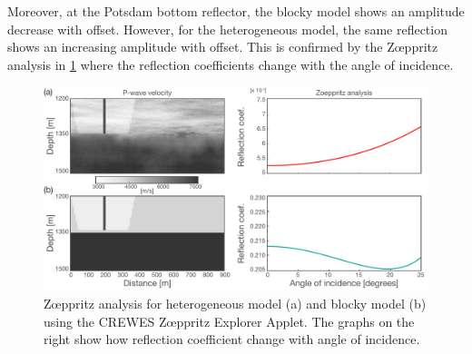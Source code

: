 Moreover, at the Potsdam bottom reflector, the blocky model shows an amplitude
decrease with offset. However, for the heterogeneous model, the same reflection
shows an increasing amplitude with offset. This is confirmed by the Zœppritz
analysis \citep{Aki1980} in \cref{fig:zoeppritz} where the reflection
coefficients change with the angle of incidence.
\begin{figure}[!ht]
\centering
\includegraphics[width=1\textwidth]{fig/zoeppritz.pdf}
\caption{Zœppritz analysis for heterogeneous model (a) and blocky model (b)
using the CREWES Zœppritz Explorer Applet. The graphs on the right show how
reflection coefficient change with angle of incidence.}
\label{fig:zoeppritz}
\end{figure}
